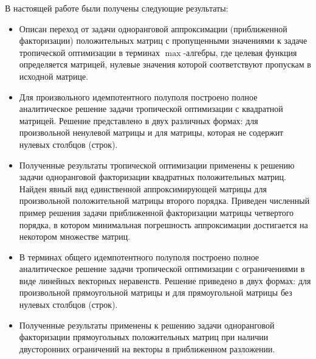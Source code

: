\documentclass[specialist,
               substylefile = spbu.rtx,
               subf,href,colorlinks=true, 12pt]{disser}
\theoremstyle{definition}
\begin{document}
В настоящей работе были получены следующие результаты:
\begin{itemize}
\item Описан переход от задачи одноранговой %
аппроксимации (приближенной факторизации) положительных матриц с пропущенными значениями к задаче тропической оптимизации в терминах $\max$-алгебры, где целевая функция  определяется матрицей, нулевые значения которой соответствуют пропускам в исходной матрице. %
\item Для произвольного идемпотентного полуполя построено полное аналитическое решение задачи тропической оптимизации %
с квадратной матрицей. 
Решение представлено в двух различных формах: для произвольной ненулевой матрицы и для матрицы, которая не содержит нулевых столбцов (строк). %
\item Полученные результаты тропической оптимизации применены к решению задачи одноранговой факторизации квадратных положительных матриц. 
Найден явный вид единственной аппроксимирующей матрицы для произвольной положительной матрицы второго порядка. 
Приведен численный пример решения задачи приближенной факторизации матрицы четвертого порядка, в котором минимальная погрешность аппроксимации достигается на некотором множестве матриц. 
\item В терминах общего идемпотентного полуполя построено полное аналитическое решение задачи тропической оптимизации с ограничениями в виде линейных векторных неравенств. Решение приведено в двух формах: для произвольной прямоугольной матрицы и для прямоугольной матрицы без нулевых столбцов (строк).  %
\item Полученные результаты применены к решению задачи одноранговой факторизации прямоугольных положительных матриц при наличии двусторонних ограничений на векторы в приближенном разложении. 

\end{itemize}
\end{document}
